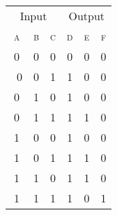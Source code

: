 \documentclass{standalone}
\begin{document}
\begin{tabular}{*{6}{c}}
	\toprule
		\multicolumn{3}{c}{Input} & \multicolumn{3}{c}{Output}\\
		\cmidrule(lr){1-3} \cmidrule(lr){4-6}
		\textsc{a} & \textsc{b} & \textsc{c} & \textsc{d} & \textsc{e} & \textsc{f} \\
	\midrule
		0 & 0 & 0 & 0 & 0 & 0 \\\
		0 & 0 & 1 & 1 & 0 & 0 \\\hline
		0 & 1 & 0 & 1 & 0 & 0 \\\hline
		0 & 1 & 1 & 1 & 1 & 0 \\\hline
		1 & 0 & 0 & 1 & 0 & 0 \\\hline
		1 & 0 & 1 & 1 & 1 & 0 \\\hline
		1 & 1 & 0 & 1 & 1 & 0 \\\hline
		1 & 1 & 1 & 1 & 0 & 1 \\
		\bottomrule
\end{tabular}
\end{document}
